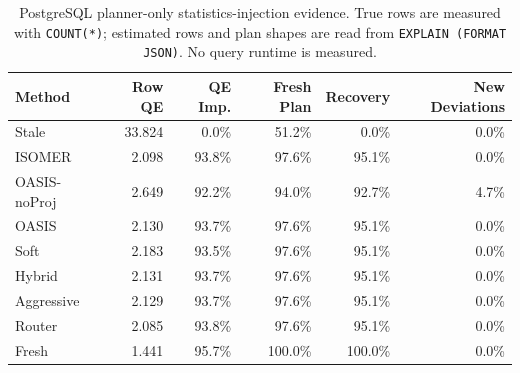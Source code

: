 \begin{table}[t]
  \centering
  \small
  \caption{PostgreSQL planner-only statistics-injection evidence. True rows are measured with \texttt{COUNT(*)}; estimated rows and plan shapes are read from \texttt{EXPLAIN (FORMAT JSON)}. No query runtime is measured.}
  \label{tab:postgres_planner_stats_injection}
  \setlength{\tabcolsep}{4pt}
  \begin{tabular}{lrrrrr}
    \toprule
    Method & Row QE & QE Imp. & Fresh Plan & Recovery & New Deviations \\
    \midrule
    Stale & 33.824 & 0.0\% & 51.2\% & 0.0\% & 0.0\% \\
    ISOMER & 2.098 & 93.8\% & 97.6\% & 95.1\% & 0.0\% \\
    OASIS-noProj & 2.649 & 92.2\% & 94.0\% & 92.7\% & 4.7\% \\
    OASIS & 2.130 & 93.7\% & 97.6\% & 95.1\% & 0.0\% \\
    Soft & 2.183 & 93.5\% & 97.6\% & 95.1\% & 0.0\% \\
    Hybrid & 2.131 & 93.7\% & 97.6\% & 95.1\% & 0.0\% \\
    Aggressive & 2.129 & 93.7\% & 97.6\% & 95.1\% & 0.0\% \\
    Router & 2.085 & 93.8\% & 97.6\% & 95.1\% & 0.0\% \\
    Fresh & 1.441 & 95.7\% & 100.0\% & 100.0\% & 0.0\% \\
    \bottomrule
  \end{tabular}
\end{table}
